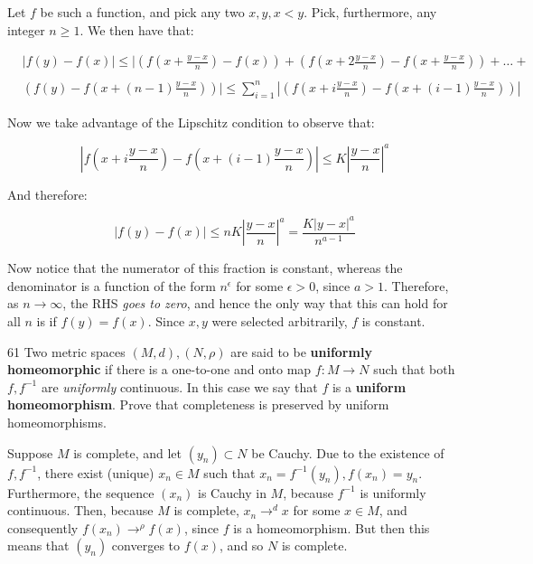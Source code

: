 \begin{solution}
    
    Let $f$ be such a function, and pick any two $x, y, x < y$.
    Pick, furthermore, any integer $n \geq 1$.
    We then have that:

    \begin{align*}
        & \lvert f(y) - f(x) \rvert \leq \Biggl\lvert\left(f\left(x + \frac{y - x}{n}\right) - f(x)\right) + \left(f\left(x + 2\frac{y - x}{n}\right) - f\left(x + \frac{y - x}{n}\right)\right) + \ldots + \\\\
        & \left(f(y) - f(x + (n - 1)\frac{y - x}{n})\right)\Biggr\rvert \leq \sum_{i=1}^{n} \left\vert \left(f\left(x + i\frac{y - x}{n}\right) - f\left(x + (i-1)\frac{y-x}{n}\right) \right) \right\vert
    \end{align*}

    Now we take advantage of the Lipschitz condition to observe that:
    
    \[\left\vert f\left(x + i\frac{y - x}{n}\right) - f\left(x + (i - 1)\frac{y - x}{n}\right) \right\vert \leq K\left\vert \frac{y - x}{n} \right\vert^{a}\]

    And therefore:

    \[\lvert f(y) - f(x) \rvert \leq n K \left\vert \frac{y - x}{n} \right\vert^{a} = \frac{K \lvert y - x \rvert^{a}}{n^{a - 1}}\]

    Now notice that the numerator of this fraction is constant, whereas the denominator is a function of the form $n^{\epsilon}$ for some $\epsilon > 0$, since $a > 1$.
    Therefore, as $n \rightarrow \infty$, the RHS \textit{goes to zero}, and hence the only way that this can hold for all $n$ is if $f(y) = f(x)$.
    Since $x, y$ were selected arbitrarily, $f$ is constant.
\end{solution}

\begin{exercise}{61}
    Two metric spaces $(M, d), (N, \rho)$ are said to be \textbf{uniformly homeomorphic} if there is a one-to-one and onto map $f: M \rightarrow N$ such that both $f, f^{-1}$ are \textit{uniformly} continuous.
    In this case we say that $f$ is a \textbf{uniform homeomorphism}.
    Prove that completeness is preserved by uniform homeomorphisms.
\end{exercise}

\begin{solution}
    
    Suppose $M$ is complete, and let $(y_n) \subset N$ be Cauchy.
    Due to the existence of $f, f^{-1}$, there exist (unique) $x_n \in M$ such that $x_n = f^{-1}(y_n), f(x_n) = y_n$.
    Furthermore, the sequence $(x_n)$ is Cauchy in $M$, because $f^{-1}$ is uniformly continuous.
    Then, because $M$ is complete, $x_n \rightarrow^{d} x$ for some $x \in M$, and consequently $f(x_n) \rightarrow^{\rho} f(x)$, since $f$ is a homeomorphism.
    But then this means that $(y_n)$ converges to $f(x)$, and so $N$ is complete.
\end{solution}

